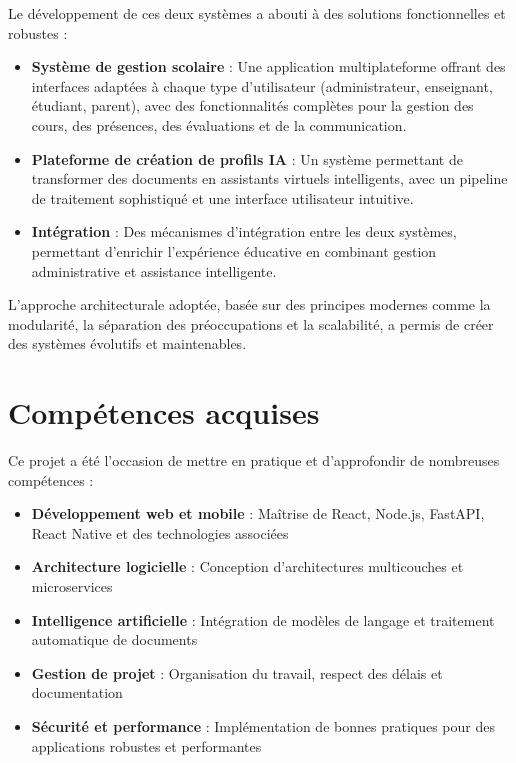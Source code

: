 \documentclass[12pt, a4paper]{report}
\begin{document}
Le développement de ces deux systèmes a abouti à des solutions fonctionnelles et robustes :

\begin{itemize}
  \item \textbf{Système de gestion scolaire} : Une application multiplateforme offrant des interfaces adaptées à chaque type d'utilisateur (administrateur, enseignant, étudiant, parent), avec des fonctionnalités complètes pour la gestion des cours, des présences, des évaluations et de la communication.
  
  \item \textbf{Plateforme de création de profils IA} : Un système permettant de transformer des documents en assistants virtuels intelligents, avec un pipeline de traitement sophistiqué et une interface utilisateur intuitive.
  
  \item \textbf{Intégration} : Des mécanismes d'intégration entre les deux systèmes, permettant d'enrichir l'expérience éducative en combinant gestion administrative et assistance intelligente.
\end{itemize}

L'approche architecturale adoptée, basée sur des principes modernes comme la modularité, la séparation des préoccupations et la scalabilité, a permis de créer des systèmes évolutifs et maintenables.

\section{Compétences acquises}

Ce projet a été l'occasion de mettre en pratique et d'approfondir de nombreuses compétences :

\begin{itemize}
  \item \textbf{Développement web et mobile} : Maîtrise de React, Node.js, FastAPI, React Native et des technologies associées
  
  \item \textbf{Architecture logicielle} : Conception d'architectures multicouches et microservices
  
  \item \textbf{Intelligence artificielle} : Intégration de modèles de langage et traitement automatique de documents
  
  \item \textbf{Gestion de projet} : Organisation du travail, respect des délais et documentation
  
  \item \textbf{Sécurité et performance} : Implémentation de bonnes pratiques pour des applications robustes et performantes
\end{itemize}
\end{document}
